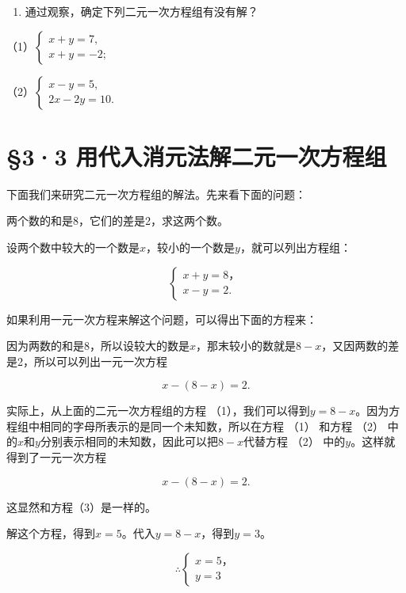 \begin{enumerate}[start=2]
\item
  通过观察，确定下列二元一次方程组有没有解？
\end{enumerate}

（1）\(\left\{ \begin{array}{l} x + y = 7, \\ x + y = -2; \end{array} \right.\)

（2）\(\left\{ \begin{array}{l} x - y = 5, \\ 2x - 2y = 10. \end{array} \right.\)

\section{§3·3 用代入消元法解二元一次方程组}

下面我们来研究二元一次方程组的解法。先来看下面的问题：

两个数的和是8，它们的差是2，求这两个数。

设两个数中较大的一个数是\(x\)，较小的一个数是\(y\)，就可以列出方程组：

\[
\left\{ \begin{array}{l} x + y = 8\text{，} \\ x - y = 2. \end{array} \right. \tag{1}
\]

如果利用一元一次方程来解这个问题，可以得出下面的方程来：

因为两数的和是8，所以设较大的数是\(x\)，那末较小的数就是\(8 - x\)，又因两数的差是2，所以可以列出一元一次方程

\[
x - (8 - x) = 2. \tag{3}
\]

实际上，从上面的二元一次方程组的方程
（1），我们可以得到\(y = 8 - x\)。因为方程组中相同的字母所表示的是同一个未知数，所以在方程
（1） 和方程 （2）
中的\(x\)和\(y\)分别表示相同的未知数，因此可以把\(8 - x\)代替方程 （2）
中的\(y\)。这样就得到了一元一次方程

\[
x - (8 - x) = 2.
\]

这显然和方程（3）是一样的。

解这个方程，得到\(x = 5\)。代入\(y = 8 - x\)，得到\(y = 3\)。

\[
\therefore \left\{ \begin{array}{l} x = 5\text{，} \\ y = 3 \end{array} \right.
\]

